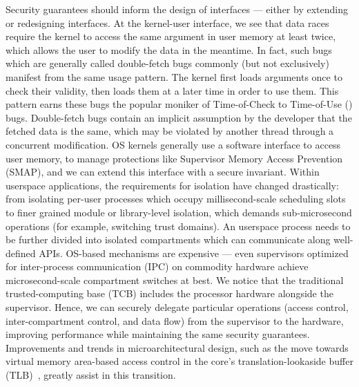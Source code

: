 Security guarantees should inform the design of interfaces --- either by 
extending or redesigning interfaces.
% 
At the kernel-user interface, we see that data races require the kernel
to access the same argument in user memory at least twice, which
allows the user to modify the data in the meantime.
In fact, such bugs which are generally called double-fetch bugs 
commonly (but not exclusively)
manifest from the same usage pattern.
The kernel first loads arguments once to check their validity, then
loads them at a later time in order to use them.
This pattern earns these bugs the popular moniker of 
Time-of-Check to Time-of-Use (\tocttou) bugs.
Double-fetch bugs contain an implicit assumption by the developer
that the fetched data is the same, which may be violated by another thread
through a concurrent modification.
OS kernels generally use a software interface to access user memory, to manage
protections like Supervisor Memory Access Prevention (SMAP), and we can
extend this interface with a secure invariant.
% 
Within userspace applications, the requirements for isolation have changed 
drastically: from isolating per-user processes which occupy millisecond-scale
scheduling slots to finer grained module or library-level isolation, which
demands sub-microsecond operations (for example, switching trust domains).
An userspace process needs to be further divided into isolated compartments
which can communicate along well-defined APIs.
OS-based mechanisms are expensive --- even supervisors optimized for
inter-process communication (IPC) on commodity hardware achieve 
microsecond-scale compartment switches at best.
We notice that the traditional trusted-computing base (TCB) includes the 
processor hardware alongside the supervisor.
Hence, we can securely delegate particular operations (access control, inter-compartment
control, and data flow) from the supervisor to the hardware, improving 
performance while maintaining the same security guarantees.
Improvements and trends in microarchitectural design, such as the move towards
virtual memory area-based access control in the core's translation-lookaside buffer 
(TLB)~\cite{0003BOBFP21midgard}, greatly assist in this transition.


